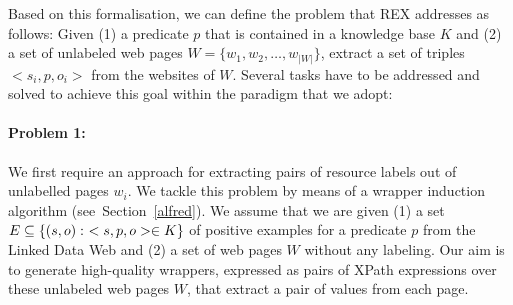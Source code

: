 \documentclass{llncs}
\newcommand{\examples}{\mbox{\ensuremath{E}}}
\begin{document}
Based on this formalisation, we can define the problem that REX addresses as follows: Given (1)
a predicate $p$ that is contained in a knowledge base $K$ 
and (2) a set of unlabeled web pages $W = \{w_1, w_2, \ldots, w_{|W|}\}$,
extract a set of triples $<s_i, p, o_i>$ from the websites of $W$.
Several tasks have to be addressed and solved to achieve this goal within the paradigm that we adopt: %


\paragraph{Problem 1:}
We first require an approach for extracting pairs of resource labels out of unlabelled pages $w_i$. 
We tackle this problem by means of a wrapper induction algorithm (see~Section~\ref{alfred}). 
We assume that we are given (1) a set ${\examples} \subseteq \{(s,o):\ <s,p,o> \in K\}$ of positive examples for a predicate $p$ from the Linked Data Web and (2) a set of web pages $W$ without any labeling. 
Our aim is to generate high-quality wrappers, expressed as pairs of XPath expressions over these unlabeled web pages $W$, that extract a pair of values from each page.
\end{document}
